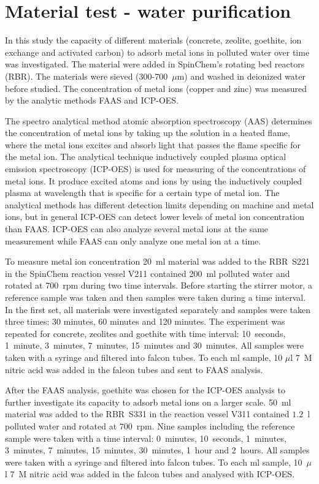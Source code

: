 \section{Material test - water purification}
In this study the capacity of different materials (concrete, zeolite, goethite,
ion exchange and activated carbon) to adsorb metal ions in polluted water over
time was investigated. The material were added in SpinChem\textsuperscript{\textregistered}'s rotating
bed reactors (RBR). The materials were sieved (300-700~$\mu$m) and washed in
deionized water before studied. The concentration of metal ions (copper and
zinc) was measured by the analytic methods FAAS and ICP-OES.

The spectro analytical method atomic absorption spectroscopy (AAS) determines the concentration of metal ions by taking up the solution in a heated flame, where the metal ions excites and absorb light that passes the flame specific for the metal ion.\cite{ford} The analytical technique inductively coupled plasma optical emission spectroscopy (ICP-OES) is used for measuring of the concentrations of metal ions. It produce excited atoms and ions by using the inductively coupled plasma at wavelength that is specific for a certain type of metal ion. The analytical methods has different detection limits depending on machine and metal ions, but in general ICP-OES can detect lower levels of metal ion concentration than FAAS. ICP-OES can also analyze several metal ions at the same measurement while FAAS can only analyze one metal ion at a time\cite{boss}\cite{fassel}. 

To measure metal ion concentration 20~ml material was added to the RBR~S221 in the SpinChem\textsuperscript{\textregistered} reaction vessel V211 contained 200~ml polluted water and rotated at 700~rpm during two time intervals. Before starting the stirrer motor, a reference sample was taken and then samples were taken during a time interval. In the first set, all materials were investigated separately and samples were taken three times: 30 minutes, 60 minutes and 120 minutes. The experiment was repeated for concrete, zeolites and goethite with time interval: 10~seconds, 1~minute, 3~minutes, 7~minutes, 15~minutes and 30~minutes. All samples were taken with a syringe and filtered into falcon tubes. To each ml sample, 10 $\mu$l 7~M nitric acid was added in the falcon tubes and sent to FAAS analysis. 

After the FAAS analysis, goethite was chosen for the ICP-OES analysis to further investigate its capacity to adsorb metal ions on a larger scale. 50~ml material was added to the RBR~S331 in the reaction vessel V311 contained $1.2$~l polluted water and rotated at 700~rpm. Nine samples including the reference sample were taken with a time interval: 0~minutes, 10~seconds, 1~minutes, 3~minutes, 7~minutes, 15~minutes, 30~minutes, 1~hour and 2~hours. All samples were taken with a syringe and filtered into falcon tubes. To each ml sample, 10~$\mu$ l 7~M nitric acid was added in the falcon tubes and analysed with ICP-OES. 

